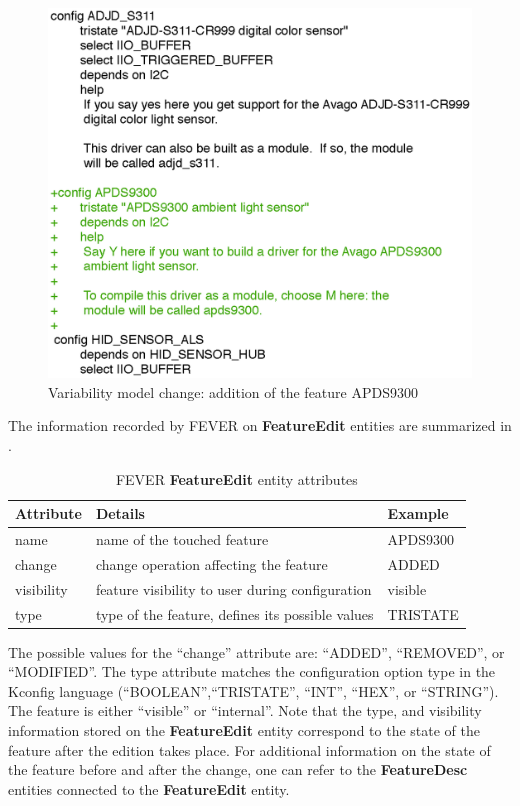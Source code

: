 \begin{figure}[h]
\centering
	\includegraphics[scale=0.5]{VM_Diff_NewFeat.eps}
	\caption{Variability model change: addition of the feature APDS9300}
	\label{fig:vm_change_diff}
\end{figure}

The information recorded by FEVER on \textbf{FeatureEdit} entities are summarized in .
\begin{table}[h]
\resizebox{\textwidth}{!}
{
\centering
{
\begin{tabular}{|l|l|l|}
\hline
Attribute & Details & Example\\
\hline
name			& name of the touched feature & APDS9300 \\
\hline
change		& change operation affecting the feature  & ADDED\\
\hline
visibility	& feature visibility to user during configuration & visible\\
\hline
type &  type of the feature, defines its possible values & TRISTATE\\
\hline
\end{tabular}
}
}
\caption{FEVER \textbf{FeatureEdit} entity attributes }
\label{featureedit_attrs}
\end{table}

The possible values for the ``change'' attribute are: ``ADDED'', ``REMOVED'', or ``MODIFIED''.
The type attribute matches the configuration option type in the Kconfig language (``BOOLEAN'',``TRISTATE'', ``INT'', ``HEX'', or ``STRING'').
The feature is either ``visible'' or ``internal''.
Note that the type, and visibility information stored on the \textbf{FeatureEdit} entity correspond to the state of the feature after the edition takes place.
For additional information on the state of the feature before and after the change, one can refer to the \textbf{FeatureDesc} entities connected
to the \textbf{FeatureEdit} entity.

